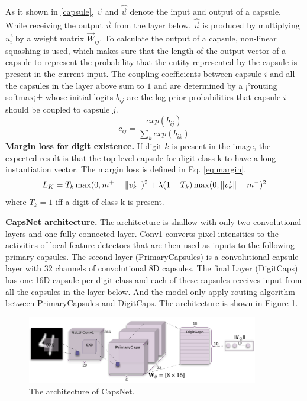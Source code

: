 \documentclass{article} %
\begin{document}
As it shown in \ref{capsule}, $\vec{v}$ and $\hat{\vec{u}}$ denote the input and output of a capsule. While receiving the output $\vec{u}$ from the layer below,  $\hat{\vec{u}}$ is produced by multiplying $\vec{u_i}$ by a weight matrix $\vec{W}_{ij}$. To calculate the output of a capsule, non-linear squashing is used, which makes sure that the length of the output vector of a capsule to represent the probability that the entity represented by the capsule is present in the current input. The coupling coefficients between capsule $i$ and all the capsules in the layer above sum to $1$ and are determined by a ¡°routing softmax¡± whose initial logits $b_{ij}$ are the log prior probabilities that capsule $i$ should be coupled to capsule $j$. 
\begin{equation}
c_{ij}=\frac{exp(b_{ij})}{\sum_{k}exp(b_{ik})}
\end{equation}
\textbf{Margin loss for digit existence.} If digit $k$ is present in the image, the expected result is that  the top-level capsule for digit class k to have a long instantiation vector. The margin loss is defined in Eq. \ref{eq:margin}.
\begin{equation}
L_K=T_k \space \max (0, m^+ - \| \vec{v_k}\| )^2 + \lambda(1-T_k) \space \max (0,\| \vec{v_k}\| - m^-)^2
\label{eq:margin}
\end{equation}
where $T_k=1$ iff a digit of class k is present.

\textbf{CapsNet architecture.} The architecture is shallow with only two convolutional layers and one fully connected layer. Conv1 converts pixel intensities to the activities of local feature detectors that are then used as inputs to the following primary capsules. The second layer (PrimaryCapsules) is a convolutional capsule layer with 32 channels of convolutional 8D capsules. The final Layer (DigitCaps) has one 16D capsule per digit class and each of these capsules receives input from all the capsules in the layer below. And the model only apply routing algorithm between PrimaryCapsules and DigitCaps. The  architecture is shown in Figure \ref{fig:capsnet}.
\begin{figure}[htbp]
	\centering
	\includegraphics[width=0.9\textwidth]{figs/capsnet.png}
	\caption{The architecture of CapsNet.}
	\label{fig:capsnet}
\end{figure}
\end{document}
